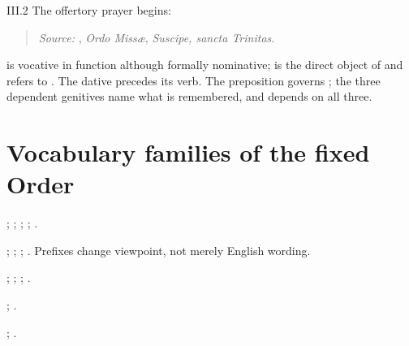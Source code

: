\begin{courseunit}{III.2}
The offertory prayer begins:

\begin{quote}

\emph{Source:} \Missal, \emph{Ordo Missæ}, \emph{Suscipe, sancta Trinitas}.
\end{quote}

 is vocative in function although formally nominative;
 is the direct object of  and refers to
. The dative  precedes its verb. The preposition
 governs ; the three dependent genitives name what is
remembered, and  depends on all three.

\section{Vocabulary families of the fixed Order}

\begin{description}[style=nextline]
  \item[Offering:] ; ;
    ; ; .
  \item[Receiving:] ; ; ;
    . Prefixes change viewpoint, not merely English wording.
  \item[Holiness:] ; ; ;
    .
  \item[Mercy and worthiness:] ;
    .
  \item[Faith and confession:] ;
    .
\end{description}




\end{courseunit}

